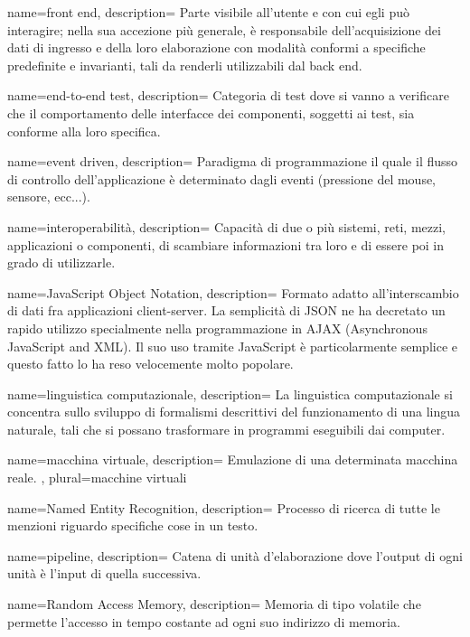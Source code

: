  {
name=front end,
description={
Parte visibile all’utente e con cui egli può interagire; nella sua accezione più
generale, è responsabile dell’acquisizione dei dati di ingresso e della loro
elaborazione con modalità conformi a specifiche predefinite e invarianti, tali
da renderli utilizzabili dal back end.
}
}

 {
name=end-to-end test,
description={
Categoria di test dove si vanno a verificare che il comportamento delle
interfacce dei componenti, soggetti ai test, sia conforme alla loro specifica.
}
}

 {
name=event driven,
description={
Paradigma di programmazione il quale il flusso di controllo dell'applicazione è
determinato dagli eventi (pressione del mouse, sensore, ecc...).
}
}

 {
name=interoperabilità,
description={
Capacità di due o più sistemi, reti, mezzi, applicazioni o componenti, di
scambiare informazioni tra loro e di essere poi in grado di utilizzarle.
}
}

 {
name=JavaScript Object Notation,
description={
Formato adatto all’interscambio di dati fra applicazioni client-server. La
semplicità di JSON ne ha decretato un rapido utilizzo specialmente nella
programmazione in AJAX (Asynchronous JavaScript and XML). Il suo uso tramite
JavaScript è particolarmente semplice e questo fatto lo ha reso velocemente
molto popolare.
}
}

 {
name=linguistica computazionale,
description={
La linguistica computazionale si concentra sullo sviluppo di formalismi
descrittivi del funzionamento di una lingua naturale, tali che si possano
trasformare in programmi eseguibili dai computer.
}
}

 {
name=macchina virtuale,
description={
Emulazione di una determinata macchina reale.
},
plural=macchine virtuali
}

 {
name=Named Entity Recognition,
description={
Processo di ricerca di tutte le menzioni riguardo specifiche cose in un testo.
}
}

 {
name=pipeline,
description={
Catena di unità d'elaborazione dove l'output di ogni unità è l'input di quella
successiva.
}
}

 {
name=Random Access Memory,
description={
Memoria di tipo volatile che permette l'accesso in tempo costante ad ogni suo
indirizzo di memoria.
}
}

